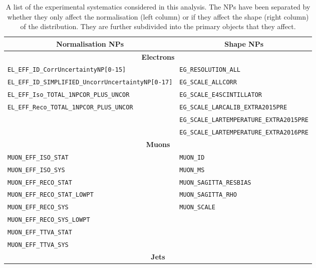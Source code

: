 \begin{table}
  \centering
  \caption{
  A list of the experimental systematics considered in this analysis. The NPs have been separated by whether they only
  affect the normalisation (left column) or if they affect the shape (right column) of the \mfl distribution. They are
  further subdivided into the primary objects that they affect.
  }
  \begin{spacing}{0.65}
  \small
  \begin{tabular}{l|l}
    \toprule
    \multicolumn{1}{c}{Normalisation NPs} & \multicolumn{1}{c}{Shape NPs} \\
    \midrule
    \multicolumn{2}{c}{\textbf{Electrons}} \\
    \midrule
    \texttt{EL\_EFF\_ID\_CorrUncertaintyNP[0-15]}               & \texttt{EG\_RESOLUTION\_ALL} \\
    \texttt{EL\_EFF\_ID\_SIMPLIFIED\_UncorrUncertaintyNP[0-17]} & \texttt{EG\_SCALE\_ALLCORR} \\
    \texttt{EL\_EFF\_Iso\_TOTAL\_1NPCOR\_PLUS\_UNCOR}           & \texttt{EG\_SCALE\_E4SCINTILLATOR} \\
    \texttt{EL\_EFF\_Reco\_TOTAL\_1NPCOR\_PLUS\_UNCOR}          & \texttt{EG\_SCALE\_LARCALIB\_EXTRA2015PRE} \\
    ~                                                           & \texttt{EG\_SCALE\_LARTEMPERATURE\_EXTRA2015PRE} \\
    ~                                                           & \texttt{EG\_SCALE\_LARTEMPERATURE\_EXTRA2016PRE} \\
    \midrule
    \multicolumn{2}{c}{\textbf{Muons}} \\
    \midrule
    \texttt{MUON\_EFF\_ISO\_STAT}         & \texttt{MUON\_ID} \\
    \texttt{MUON\_EFF\_ISO\_SYS}          & \texttt{MUON\_MS} \\
    \texttt{MUON\_EFF\_RECO\_STAT}        & \texttt{MUON\_SAGITTA\_RESBIAS} \\
    \texttt{MUON\_EFF\_RECO\_STAT\_LOWPT} & \texttt{MUON\_SAGITTA\_RHO} \\
    \texttt{MUON\_EFF\_RECO\_SYS}         & \texttt{MUON\_SCALE} \\
    \texttt{MUON\_EFF\_RECO\_SYS\_LOWPT}  & ~ \\
    \texttt{MUON\_EFF\_TTVA\_STAT}        & ~ \\
    \texttt{MUON\_EFF\_TTVA\_SYS}         & ~ \\
    \midrule
    \multicolumn{2}{c}{\textbf{Jets}} \\

\end{tabular}
\end{spacing}
\end{table}
